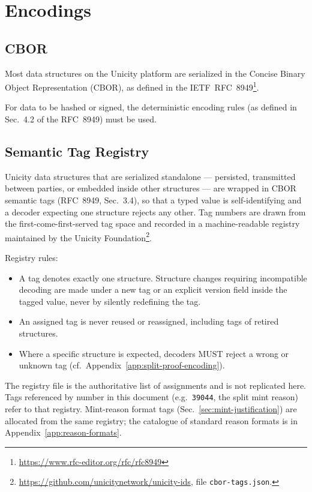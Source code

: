 \chapter{Encodings}\label{app:encodings}

\section{CBOR}

Most data structures on the Unicity platform are serialized in the Concise Binary Object Representation (CBOR), as defined in the IETF~RFC~8949\footnote{\url{https://www.rfc-editor.org/rfc/rfc8949}}.

For data to be hashed or signed, the deterministic encoding rules (as defined in Sec.~4.2 of the RFC~8949) must be used.

\section{Semantic Tag Registry}\label{app:cbor-tags}

Unicity data structures that are serialized standalone --- persisted, transmitted between parties, or embedded inside other structures --- are wrapped in CBOR semantic tags (RFC~8949, Sec.~3.4), so that a typed value is self-identifying and a decoder expecting one structure rejects any other. Tag numbers are drawn from the first-come-first-served tag space and recorded in a machine-readable registry maintained by the Unicity Foundation\footnote{\url{https://github.com/unicitynetwork/unicity-ids}, file \texttt{cbor-tags.json}.}.

Registry rules:
\begin{itemize}
	\item A tag denotes exactly one structure. Structure changes requiring incompatible decoding are made under a new tag or an explicit version field inside the tagged value, never by silently redefining the tag.
	\item An assigned tag is never reused or reassigned, including tags of retired structures.
	\item Where a specific structure is expected, decoders MUST reject a wrong or unknown tag (cf.\ Appendix~\ref{app:split-proof-encoding}).
\end{itemize}

The registry file is the authoritative list of assignments and is not replicated here. Tags referenced by number in this document (e.g.\ \texttt{39044}, the split mint reason) refer to that registry. Mint-reason format tags (Sec.~\ref{sec:mint-justification}) are allocated from the same registry; the catalogue of standard reason formats is in Appendix~\ref{app:reason-formats}.

